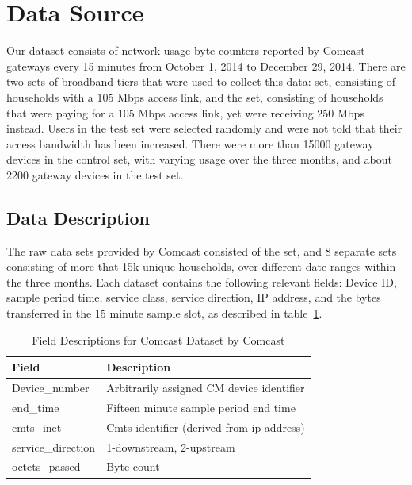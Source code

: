 \section{Data Source}
\label{sec:data}
Our dataset consists of network usage byte counters reported by Comcast gateways 
every 15 minutes from October 1, 2014 to December 29, 2014. There are two sets 
of broadband tiers that were used to collect this data: \control set, consisting 
of households with a 105 Mbps access link, and the \test set, consisting of 
households that were paying for a 105 Mbps access link, yet were receiving 250 
Mbps instead. Users in the test set were selected randomly and were not told 
that their access bandwidth has been increased. There were more than 15000 
gateway devices in the control set, with varying usage over the three months, 
and about 2200 gateway devices in the test set.


\subsection{Data Description}

The raw data sets provided by Comcast consisted of the \test set, and 8 separate 
\control sets consisting of more that 15k unique households, over different 
date ranges within the three months. Each dataset contains the following 
relevant fields: Device ID, sample period time, service class, service 
direction, IP address, and the bytes transferred in the 15 minute sample slot, 
as described in table~\ref{tab:field-description}.

\begin{table}[ht!]
\small
\begin{tabular}{|l|l|}
\hline
\textbf{Field}         & \textbf{Description}                      \\ \hline
Device\_number         & Arbitrarily assigned CM device identifier \\ \hline
end\_time              & Fifteen minute sample period end time     \\ \hline
cmts\_inet             & Cmts identifier (derived from ip address) \\ \hline
service\_direction     & 1-downstream, 2-upstream                  \\ \hline
octets\_passed         & Byte count                                \\ \hline
\end{tabular}
\caption{Field Descriptions for Comcast Dataset by Comcast}
\label{tab:field-description}
\end{table}

